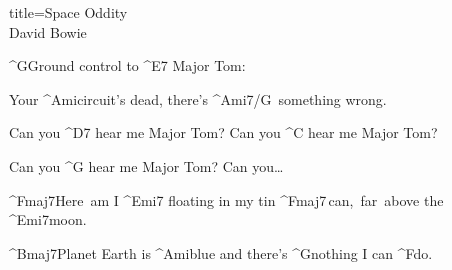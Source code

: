 \begin{song}{title=\predtitle\centering Space Oddity \\\large David Bowie  \vspace*{-0.3cm}}
\begin{centerjustified}
	^{G\z}Ground control to ^{E7\,\,}Major Tom:

	Your ^{Ami{\z}}circuit's dead, there's ^{Ami7/G\,\,\,}something wrong.

	Can you ^{D7\,\,}hear me Major Tom? Can you ^{C\,\,}hear me Major Tom? 

	Can you ^{G\,\,}hear me Major Tom? Can you\dots

	^{Fmaj7\z}Here~am I ^{Emi7\,\,}floating in my tin ^{Fmaj7\,}can,~far~above the ^{Emi7}moon.

	^{Bmaj7}Planet Earth is ^{Ami}blue and there's ^{G\z}nothing I can ^{F}do.


\end{centerjustified}

\centering
{}

\centering
{}

\setcounter{Slokočet}{0}
\end{song}
